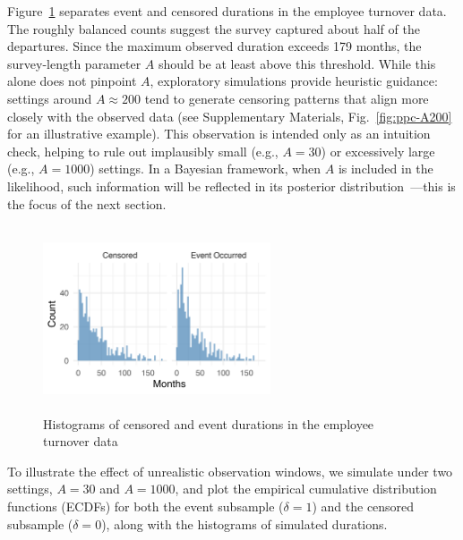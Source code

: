 
Figure~\ref{fig:离职数据分开的直方图} separates event and censored durations in the employee turnover data. The roughly balanced counts suggest the survey captured about half of the departures. Since the maximum observed duration exceeds 179 months, the survey-length parameter $A$ should be at least above this threshold. While this alone does not pinpoint $A$, exploratory simulations provide heuristic guidance: settings around $A \approx 200$ tend to generate censoring patterns that align more closely with the observed data (see Supplementary Materials, Fig.~\ref{fig:ppc-A200} for an illustrative example). This observation is intended only as an intuition check, helping to rule out implausibly small (e.g., $A=30$) or excessively large (e.g., $A=1000$) settings. In a Bayesian framework, when $A$ is included in the likelihood, such information will be reflected in its posterior distribution~\cite{bartovs2022informed}—this is the focus of the next section.
\begin{figure}[H]
    \centering
    \includegraphics[height=5.5cm, width=0.6\textwidth]{images/separate_hist.png}
    \caption{{\small Histograms of censored and event durations in the employee turnover data}}
    \label{fig:离职数据分开的直方图}
\end{figure}
To illustrate the effect of unrealistic observation windows, we simulate under two settings, $A = 30$ and $A = 1000$, and plot the empirical cumulative distribution functions (ECDFs) for both the event subsample ($\delta = 1$) and the censored subsample ($\delta = 0$), along with the histograms of simulated durations.

